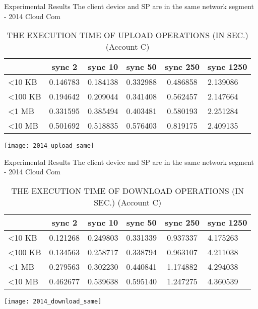 \begin{frame}{Experimental Results}
{The client device and SP are in the same network segment - 2014 Cloud Com}
	\scriptsize
    \begin{table}[]
    \centering
    \caption{THE EXECUTION TIME OF \alert{UPLOAD} OPERATIONS (IN SEC.) (Account C)}
    \begin{tabular}{lccccl}
                         & sync 2   & sync 10  & sync 50  & sync 250 & sync 1250 \\ \hline
        \textless 10 KB  & 0.146783 & 0.184138 & 0.332988 & 0.486858 & 2.139086  \\ \hline
        \textless 100 KB & 0.194642 & 0.209044 & 0.341408 & 0.562457 & 2.147664  \\ \hline
        \textless 1 MB   & 0.331595 & 0.385494 & 0.403481 & 0.580193 & 2.251284  \\ \hline
        \textless 10 MB  & 0.501692 & 0.518835 & 0.576403 & 0.819175 & 2.409135  \\ \hline
    \end{tabular}
    \end{table}
    \begin{center}
		\texttt{[image: 2014\_upload\_same]}
    \end{center}
\end{frame}

\begin{frame}{Experimental Results}
{The client device and SP are in the same network segment - 2014 Cloud Com}
	\scriptsize
    \begin{table}[]
    \centering
    \caption{THE EXECUTION TIME OF \alert{DOWNLOAD} OPERATIONS (IN SEC.) (Account C)}
    \begin{tabular}{lccccl}
                         & sync 2   & sync 10  & sync 50  & sync 250 & sync 1250 \\ \hline
        \textless 10 KB  & 0.121268 & 0.249803 & 0.331339 & 0.937337 & 4.175263  \\ \hline
        \textless 100 KB & 0.134563 & 0.258717 & 0.338794 & 0.963107 & 4.211038  \\ \hline
        \textless 1 MB   & 0.279563 & 0.302230 & 0.440841 & 1.174882 & 4.294038  \\ \hline
        \textless 10 MB  & 0.462677 & 0.539638 & 0.595140 & 1.247275 & 4.360539  \\ \hline
    \end{tabular}
    \end{table}
    \begin{center}
		\texttt{[image: 2014\_download\_same]}
    \end{center}
\end{frame}

